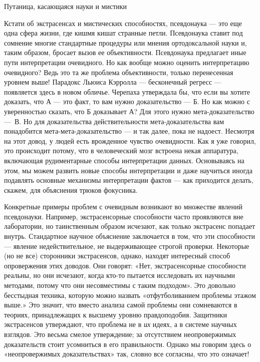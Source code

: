 Путаница, касающаяся науки и мистики

Кстати об экстрасенсах и мистических способностях, псевдонаука --- это еще одна сфера жизни, где кишмя кишат странные петли. Псевдонаука ставит под сомнение многие стандартные процедуры или мнения ортодоксальной науки и, таким образом, бросает вызов ее объективности. Псевдонаука предлагает иные пути интерпретации очевидного. Но как вообще можно оценить интерпретацию очевидного? Ведь это та же проблема объективности, только перенесенная уровнем выше! Парадокс Льюиса Кэрролла --- бесконечный регресс --- появляется здесь в новом обличье. Черепаха утверждала бы, что если вы хотите доказать, что А --- это факт, то вам нужно доказательство --- Б. Но как можно с уверенностью сказать, что Б доказывает А? Для этого нужно мета-доказательство ---~В. Но для доказательства действительности мета-доказательства вам понадобится мета-мета-доказательство --- и так далее, пока не надоест. Несмотря на этот довод, у людей есть врожденное чувство очевидности. Как я уже говорил, это происходит потому, что в человеческий мозг встроена некая аппаратура, включающая рудиментарные способы интерпретации данных. Основываясь на этом, мы можем развить новые способы интерпретации и даже научиться иногда подавлять основные механизмы интерпретации фактов --- как приходится делать, скажем, для объяснения трюков фокусника.

Конкретные примеры проблем с очевидным возникают во множестве явлений псевдонауки. Например, экстрасенсорные способности часто проявляются вне лаборатории, но таинственным образом исчезают, как только экстрасенс попадает внутрь. Стандартное научное объяснение заключается в том, что эти способности --- явление недействительное, не выдерживающее строгой проверки. Некоторые (но не все) сторонники экстрасенсов, однако, находят интересный способ опровержения этих доводов. Они говорят: «Нет, экстрасенсорные способности реальны, но они исчезают, когда кто-то пытается исследовать их научными методами, потому что они несовместимы с таким подходом». Это довольно бесстыдная техника, которую можно назвать «отфутболиванием проблемы этажом выше.» Это значит, что вместо анализа самой проблемы они сомневаются в теориях, принадлежащих к высшему уровню правдоподобия. Защитники экстрасенсов утверждают, что проблема не в \emph{их} идеях, а в системе научных взглядов. Это весьма смелое утверждение; за отсутствием неопровержимых доказательств стоит усомниться в его правильности. Однако мы говорим здесь о «неопровержимых доказательствах» так, словно все согласны, что это означает!

